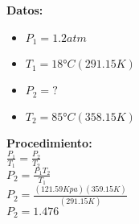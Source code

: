 \documentclass[12pt, letterpaper]{article}
\begin{document}
\begin{multicols}{2}
\large \textbf{Datos:}
\begin{itemize}
    \item $P_1 = 1.2 atm$
    \item $T_1 = 18°C (291.15K)$
    \item $P_2 = ?$
    \item $T_2 = 85°C (358.15 K)$
\end{itemize}
\columnbreak


\large \textbf{Procedimiento:}\\

\large $\frac{P_1}{T_1} = \frac{P_2}{T_2}$\\

\large $P_2 = \frac{P_1T_2}{T_1}$ \\

\large $P_2 = \frac{(121.59Kpa)(359.15K)}{(291.15K)}$ \\

\ul {\large $P_2 = 1.476 $}






\end{multicols}
\end{document}
